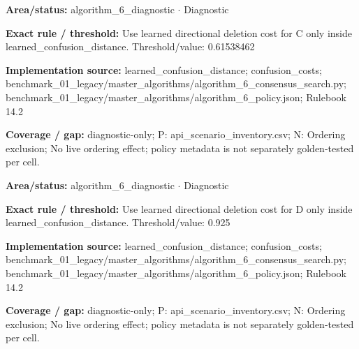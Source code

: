 \begin{tcolorbox}[enhanced,breakable,colback=white,colframe=Muted!45,boxrule=0.45pt,arc=1.5pt,left=6pt,right=6pt,top=5pt,bottom=5pt,title={\texttt{A6-LEARNED-DELETION-C}},title after break={\texttt{A6-LEARNED-DELETION-C}\ (continued)},fonttitle=\headingfont\bfseries\color{Navy},coltitle=Navy]
\textbf{Area/status:} algorithm\_\allowbreak{}6\_\allowbreak{}diagnostic $\boldsymbol{\cdot}$ Diagnostic\par
\smallskip
\textbf{Exact rule / threshold:} Use learned directional deletion cost for C only inside learned\_\allowbreak{}confusion\_\allowbreak{}distance. Threshold/\allowbreak{}value: 0.61538462\par
\smallskip
\textbf{Implementation source:} learned\_\allowbreak{}confusion\_\allowbreak{}distance; confusion\_\allowbreak{}costs; benchmark\_\allowbreak{}01\_\allowbreak{}legacy/\allowbreak{}master\_\allowbreak{}algorithms/\allowbreak{}algorithm\_\allowbreak{}6\_\allowbreak{}consensus\_\allowbreak{}search.py; benchmark\_\allowbreak{}01\_\allowbreak{}legacy/\allowbreak{}master\_\allowbreak{}algorithms/\allowbreak{}algorithm\_\allowbreak{}6\_\allowbreak{}policy.json; Rulebook 14.2\par
\smallskip
\textbf{Coverage / gap:} diagnostic-only; P: api\_\allowbreak{}scenario\_\allowbreak{}inventory.csv; N: Ordering exclusion; No live ordering effect; policy metadata is not separately golden-tested per cell.
\end{tcolorbox}
\begin{tcolorbox}[enhanced,breakable,colback=white,colframe=Muted!45,boxrule=0.45pt,arc=1.5pt,left=6pt,right=6pt,top=5pt,bottom=5pt,title={\texttt{A6-LEARNED-DELETION-D}},title after break={\texttt{A6-LEARNED-DELETION-D}\ (continued)},fonttitle=\headingfont\bfseries\color{Navy},coltitle=Navy]
\textbf{Area/status:} algorithm\_\allowbreak{}6\_\allowbreak{}diagnostic $\boldsymbol{\cdot}$ Diagnostic\par
\smallskip
\textbf{Exact rule / threshold:} Use learned directional deletion cost for D only inside learned\_\allowbreak{}confusion\_\allowbreak{}distance. Threshold/\allowbreak{}value: 0.925\par
\smallskip
\textbf{Implementation source:} learned\_\allowbreak{}confusion\_\allowbreak{}distance; confusion\_\allowbreak{}costs; benchmark\_\allowbreak{}01\_\allowbreak{}legacy/\allowbreak{}master\_\allowbreak{}algorithms/\allowbreak{}algorithm\_\allowbreak{}6\_\allowbreak{}consensus\_\allowbreak{}search.py; benchmark\_\allowbreak{}01\_\allowbreak{}legacy/\allowbreak{}master\_\allowbreak{}algorithms/\allowbreak{}algorithm\_\allowbreak{}6\_\allowbreak{}policy.json; Rulebook 14.2\par
\smallskip
\textbf{Coverage / gap:} diagnostic-only; P: api\_\allowbreak{}scenario\_\allowbreak{}inventory.csv; N: Ordering exclusion; No live ordering effect; policy metadata is not separately golden-tested per cell.
\end{tcolorbox}
